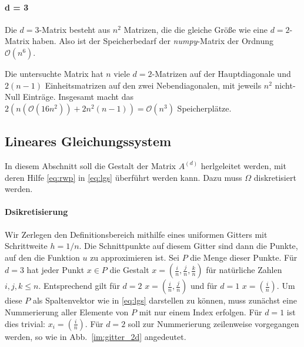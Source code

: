 \documentclass[smallheadings]{scrartcl}
\begin{document}
 \paragraph{d = 3}
 Die $d=3$-Matrix besteht aus $n^2$ Matrizen, die die gleiche Größe wie eine $d=2$-Matrix haben. Also ist der Speicherbedarf der \textit{numpy}-Matrix der Ordnung $\mathcal{O}(n^6)$.
 
 Die untersuchte Matrix hat $n$ viele $d=2$-Matrizen auf der Hauptdiagonale  und $2(n-1)$ Einheitsmatrizen auf den zwei Nebendiagonalen, mit jeweils $n^2$ nicht-Null Einträge. Insgesamt macht das $2(n(\mathcal{O}(16n^2))+2n^2(n-1))=\mathcal{O}(n^3)$ Speicherplätze.


\subsection{Lineares Gleichungssystem}

In diesem Abschnitt soll die Gestalt der Matrix $A^{(d)}$ herlgeleitet werden, mit deren Hilfe \eqref{eq:rwp} in \eqref{eq:lgs} überführt werden kann. Dazu muss $\Omega$ diskretisiert werden.


\paragraph{ Dsikretisierung}

Wir Zerlegen den Definitionsbereich mithilfe eines uniformen Gitters mit Schrittweite $h = 1/n$. Die Schnittpunkte auf diesem Gitter sind dann die Punkte, auf den die Funktion $u$ zu approximieren ist. Sei $P$ die Menge dieser Punkte. Für $d=3$ hat jeder Punkt $x\in P$ die Gestalt $x = (\frac{i}{n}, \frac{j}{n}, \frac{k}{n})$ für natürliche Zahlen $i, j, k \leq n$. Entsprechend gilt für $d=2$ $x=(\frac{i}{n}, \frac{j}{n})$ und für $d=1$ $x=(\frac{i}{n})$.
Um diese $P$ als Spaltenvektor wie in \eqref{eq:lgs} darstellen zu können, muss zunächst eine Nummerierung aller Elemente von $P$ mit nur einem Index erfolgen. Für $d=1$ ist dies trivial: $x_i = (\frac{i}{n})$. 
Für $d=2$ soll zur Nummerierung zeilenweise vorgegangen werden, so wie in Abb.~\ref{im:gitter_2d} angedeutet.
\end{document}
